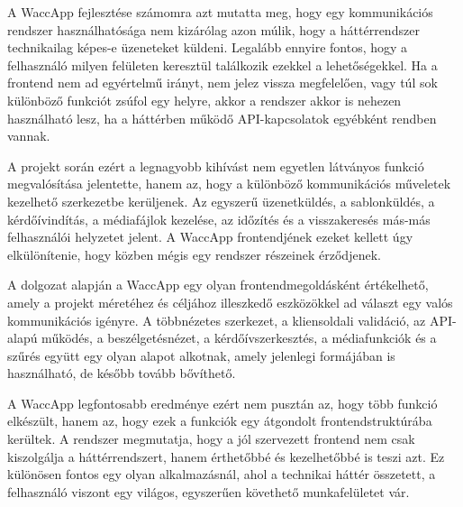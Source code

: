 A WaccApp fejlesztése számomra azt mutatta meg, hogy egy kommunikációs rendszer használhatósága nem kizárólag azon múlik, hogy a háttérrendszer technikailag képes-e üzeneteket küldeni. Legalább ennyire fontos, hogy a felhasználó milyen felületen keresztül találkozik ezekkel a lehetőségekkel. Ha a frontend nem ad egyértelmű irányt, nem jelez vissza megfelelően, vagy túl sok különböző funkciót zsúfol egy helyre, akkor a rendszer akkor is nehezen használható lesz, ha a háttérben működő API-kapcsolatok egyébként rendben vannak. 

A projekt során ezért a legnagyobb kihívást nem egyetlen látványos funkció megvalósítása jelentette, hanem az, hogy a különböző kommunikációs műveletek kezelhető szerkezetbe kerüljenek. Az egyszerű üzenetküldés, a sablonküldés, a kérdőívindítás, a médiafájlok kezelése, az időzítés és a visszakeresés más-más felhasználói helyzetet jelent. A WaccApp frontendjének ezeket kellett úgy elkülönítenie, hogy közben mégis egy rendszer részeinek érződjenek. 

A dolgozat alapján a WaccApp egy olyan frontendmegoldásként értékelhető, amely a projekt méretéhez és céljához illeszkedő eszközökkel ad választ egy valós kommunikációs igényre. A többnézetes szerkezet, a kliensoldali validáció, az API-alapú működés, a beszélgetésnézet, a kérdőívszerkesztés, a médiafunkciók és a szűrés együtt egy olyan alapot alkotnak, amely jelenlegi formájában is használható, de később tovább bővíthető. 

A WaccApp legfontosabb eredménye ezért nem pusztán az, hogy több funkció elkészült, hanem az, hogy ezek a funkciók egy átgondolt frontendstruktúrába kerültek. A rendszer megmutatja, hogy a jól szervezett frontend nem csak kiszolgálja a háttérrendszert, hanem érthetőbbé és kezelhetőbbé is teszi azt. Ez különösen fontos egy olyan alkalmazásnál, ahol a technikai háttér összetett, a felhasználó viszont egy világos, egyszerűen követhető munkafelületet vár. 
